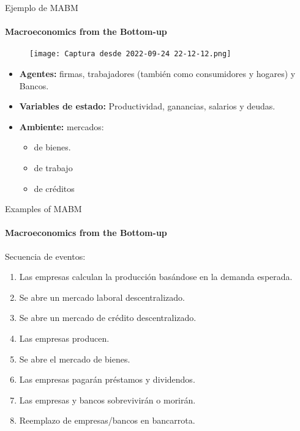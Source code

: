 \documentclass[11pt]{beamer}
\begin{document}
\begin{frame}{Ejemplo de MABM}
\framesubtitle{Macroeconomics from the Bottom-up}
    \begin{figure}
        \centering
        \texttt{[image: Captura desde 2022-09-24 22-12-12.png]}
        \label{fig:my_label}
    \end{figure}
    \begin{multicols}{2}
\begin{itemize}
    \item \textbf{Agentes:} firmas, trabajadores (también como consumidores y hogares) y Bancos.
\item \textbf{Variables de estado:} Productividad, ganancias, salarios y deudas.
\item \textbf{Ambiente:} mercados:
\begin{itemize}
    \item de bienes.
\item de trabajo
\item de créditos
\end{itemize}
\end{itemize}        
    \end{multicols}
\end{frame}

\begin{frame}{Examples of MABM}
\framesubtitle{Macroeconomics from the Bottom-up}
Secuencia de eventos:
\begin{enumerate}
\item Las empresas calculan la producción basándose en la demanda esperada.
\item Se abre un mercado laboral descentralizado.
\item Se abre un mercado de crédito descentralizado.
\item Las empresas producen.
\item Se abre el mercado de bienes.
\item Las empresas pagarán préstamos y dividendos.
\item Las empresas y bancos sobrevivirán o morirán.
\item Reemplazo de empresas/bancos en bancarrota.
    \end{enumerate}
\end{frame}
\end{document}
